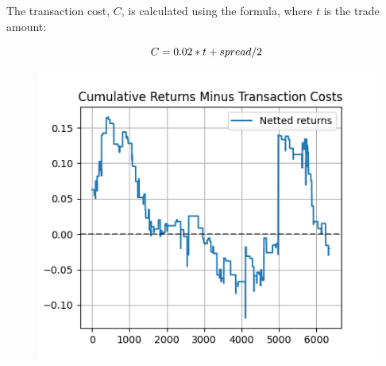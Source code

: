 \documentclass[a4paper]{article}
\begin{document}
The transaction cost, $C$, is calculated using the formula, where $t$ is the trade amount:

\begin{equation}
\label{eq:NPV_L}
C = 0.02 * t + spread/2
\end{equation}


\begin{figure}[H]
    \begin{center}
        \includegraphics{../generated/cumulative_returns_except_trans_costs.png}
    \end{center}
\end{figure}


\end{document}
